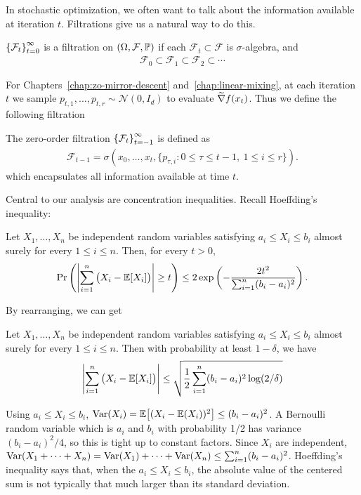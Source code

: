 In stochastic optimization, we often want to talk about the information available at iteration $t$. Filtrations give us a natural way to do this. 
\begin{definition}
    $\left\{\mathcal F_t\right\}_{t=0}^\infty$ is a filtration on $(\Omega, \mathcal F, \mathbb{P})$ if each $\mathcal F_t \subset \mathcal F$ is $\sigma$-algebra, and
    \begin{align*}
        \mathcal F_0 \subset \mathcal F_1 \subset \mathcal F_2 \subset \cdots
    \end{align*}
\end{definition}
For Chapters~\ref{chap:zo-mirror-descent} and~\ref{chap:linear-mixing}, at each iteration $t$ we sample $p_{t,1}, \ldots, p_{t,r} \sim \mathcal N(0,I_d)$ to evaluate $\widetilde {\nabla} f(x_t)$. Thus we define the following filtration
\begin{definition}
    The zero-order filtration $\left\{\mathcal F_t\right\}_{t=-1}^\infty$ is defined as
    \begin{align*}
        \mathcal F_{t-1}
    =
    \sigma\left(
        x_0,\ldots,x_t,
        \{p_{\tau,i}:0\leq \tau\leq t-1,\ 1\leq i\leq r\}
    \right).
    \end{align*}
    which encapsulates all information available at time $t$. 
\end{definition}
Central to our analysis are concentration inequalities. Recall Hoeffding's inequality:
\begin{lemma}
    Let $X_1,\ldots,X_n$ be independent random variables satisfying
    $a_i \leq X_i \leq b_i$ almost surely for every $1\leq i\leq n$.
    Then, for every $t>0$,
    \[
        \Pr\left(
            \left|
                \sum_{i=1}^n \big(X_i - \mathbb{E}\qty[X_i]\big)
            \right|
            \geq t
        \right)
        \leq
        2\exp\left(
            -\frac{2t^2}
            {\sum_{i=1}^n (b_i-a_i)^2}
        \right).
    \]
\end{lemma}
By rearranging, we can get
\begin{lemma}
    Let $X_1,\ldots,X_n$ be independent random variables satisfying
    $a_i \leq X_i \leq b_i$ almost surely for every $1\leq i\leq n$. Then with probability at least $1-\delta$, we have
    \begin{align*}
        \left|\sum_{i=1}^n \big(X_i - \mathbb{E}\qty[X_i]\big)\right| \leq \sqrt{\frac 12\sum_{i=1}^n (b_i-a_i)^2 \log(2/\delta)}
    \end{align*}
\end{lemma}
Using $a_i \leq X_i \leq b_i$, $\mathrm{Var}\qty(X_i) = \mathbb{E}\qty[(X_i-\mathbb{E}\qty(X_i))^2] \leq (b_i-a_i)^2$. A Bernoulli random variable which is $a_i$ and $b_i$ with probability 1/2 has variance $(b_i-a_i)^2/4$, so this is tight up to constant factors. Since $X_i$ are independent, $\mathrm{Var}\qty(X_1 + \cdots + X_n) = \mathrm{Var}\qty(X_1) + \cdots + \mathrm{Var}\qty(X_n) \leq \sum_{i=1}^n (b_i-a_i)^2$. Hoeffding's inequality says that, when the $a_i \leq X_i \leq b_i$, the absolute value of the centered sum is not typically that much larger than its standard deviation. 

